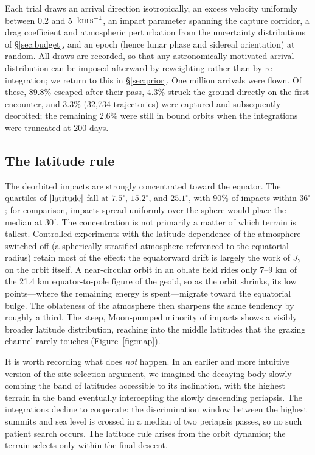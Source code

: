 \documentclass[twocolumn]{aastex701}
\newcommand{\kms}{\ensuremath{{\rm \,km\,s^{-1}}}}
\begin{document}
Each trial draws an arrival direction isotropically, an excess velocity
uniformly between 0.2 and 5 \kms, an impact parameter spanning the
capture corridor, a drag coefficient and atmospheric perturbation from
the uncertainty distributions of \S\ref{sec:budget}, and an epoch (hence
lunar phase and sidereal orientation) at random. All draws are recorded,
so that any astronomically motivated arrival distribution can be imposed
afterward by reweighting rather than by re-integration; we return to this
in \S\ref{sec:prior}. One million arrivals were flown. Of these, 89.8\%
escaped after their pass, 4.3\% struck the ground directly on the first
encounter, and 3.3\% (32,734 trajectories) were captured and subsequently
deorbited; the remaining 2.6\% were still in bound orbits when the
integrations were truncated at 200 days.

\subsection{The latitude rule} \label{sec:latitude}

The deorbited impacts are strongly concentrated toward the equator. The
quartiles of $|{\rm latitude}|$ fall at $7.5^{\circ}$, $15.2^{\circ}$, and
$25.1^{\circ}$, with 90\% of impacts within $36^{\circ}$; for comparison,
impacts spread uniformly over the sphere would place the median at
$30^{\circ}$. The concentration is not primarily a matter of which
terrain is tallest. Controlled experiments with the latitude dependence
of the atmosphere switched off (a spherically stratified atmosphere
referenced to the equatorial radius) retain most of the effect: the
equatorward drift is largely the work of $J_{2}$ on the orbit itself.
A near-circular orbit in an oblate field rides only 7--9 km of the 21.4 km
equator-to-pole figure of the geoid, so as the orbit shrinks, its low
points---where the remaining energy is spent---migrate toward the
equatorial bulge. The oblateness of the atmosphere then sharpens the
same tendency by roughly a third. The steep, Moon-pumped minority of
impacts shows a visibly broader latitude distribution, reaching into the
middle latitudes that the grazing channel rarely touches
(Figure~\ref{fig:map}).

It is worth recording what does \emph{not} happen. In an earlier and more
intuitive version of the site-selection argument, we imagined the decaying
body slowly combing the band of latitudes accessible to its inclination,
with the highest terrain in the band eventually intercepting the slowly
descending periapsis. The integrations decline to cooperate: the
discrimination window between the highest summits and sea level is
crossed in a median of two periapsis passes, so no such patient search
occurs. The latitude rule arises from the orbit dynamics; the terrain
selects only within the final descent.
\end{document}
